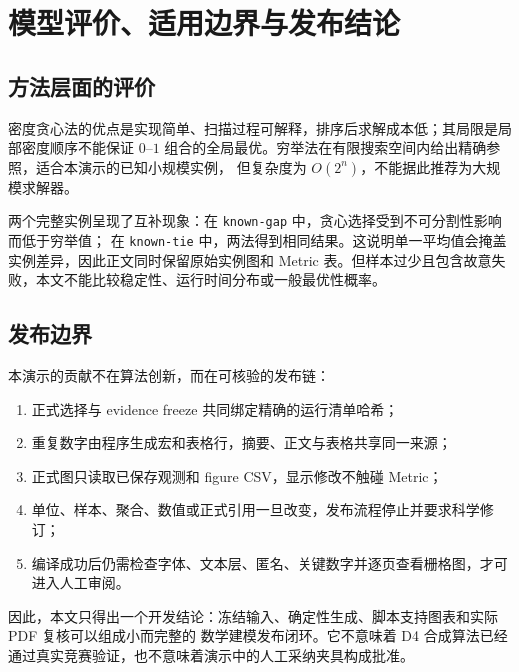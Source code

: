 \section{模型评价、适用边界与发布结论}

\subsection{方法层面的评价}

密度贪心法的优点是实现简单、扫描过程可解释，排序后求解成本低；其局限是局部密度顺序不能保证
$0$--$1$ 组合的全局最优。穷举法在有限搜索空间内给出精确参照，适合本演示的已知小规模实例，
但复杂度为 $O(2^n)$，不能据此推荐为大规模求解器。

两个完整实例呈现了互补现象：在 \texttt{known-gap} 中，贪心选择受到不可分割性影响而低于穷举值；
在 \texttt{known-tie} 中，两法得到相同结果。这说明单一平均值会掩盖实例差异，因此正文同时保留原始实例图和
Metric 表。但样本过少且包含故意失败，本文不能比较稳定性、运行时间分布或一般最优性概率。

\subsection{发布边界}

本演示的贡献不在算法创新，而在可核验的发布链：
\begin{enumerate}
  \item 正式选择与 evidence freeze 共同绑定精确的运行清单哈希；
  \item 重复数字由程序生成宏和表格行，摘要、正文与表格共享同一来源；
  \item 正式图只读取已保存观测和 figure CSV，显示修改不触碰 Metric；
  \item 单位、样本、聚合、数值或正式引用一旦改变，发布流程停止并要求科学修订；
  \item 编译成功后仍需检查字体、文本层、匿名、关键数字并逐页查看栅格图，才可进入人工审阅。
\end{enumerate}

因此，本文只得出一个开发结论：冻结输入、确定性生成、脚本支持图表和实际 PDF 复核可以组成小而完整的
数学建模发布闭环。它不意味着 D4 合成算法已经通过真实竞赛验证，也不意味着演示中的人工采纳夹具构成批准。

